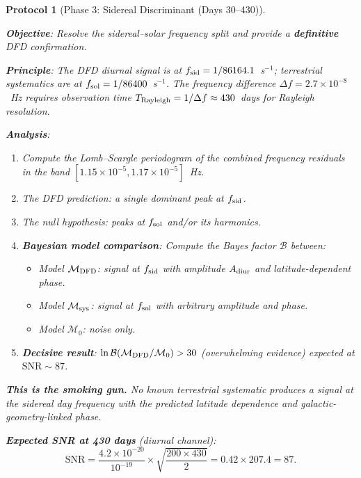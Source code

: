 \documentclass[11pt]{article}
\newtheorem{protocol}{Protocol}
\newcommand{\ee}[1]{\times 10^{#1}}
\begin{document}
\begin{protocol}[Phase 3: Sidereal Discriminant (Days 30--430)]
\label{prot:phase3}
\mbox{}

\textbf{Objective}: Resolve the sidereal--solar frequency split and
provide a \textbf{definitive} DFD confirmation.

\textbf{Principle}: The DFD diurnal signal is at $f_{\rm sid} =
1/86164.1$~s$^{-1}$; terrestrial systematics are at $f_{\rm sol} =
1/86400$~s$^{-1}$. The frequency difference $\Delta f = 2.7\ee{-8}$~Hz
requires observation time $T_{\rm Rayleigh} = 1/\Delta f \approx
430$~days for Rayleigh resolution.

\textbf{Analysis}:
\begin{enumerate}[nosep]
\item Compute the Lomb--Scargle periodogram of the combined frequency
  residuals in the band $[1.15\ee{-5}, 1.17\ee{-5}]$~Hz.
\item The DFD prediction: a single dominant peak at $f_{\rm sid}$.
\item The null hypothesis: peaks at $f_{\rm sol}$ and/or its harmonics.
\item \textbf{Bayesian model comparison}: Compute the Bayes factor
  $\mathcal{B}$ between:
  \begin{itemize}[nosep]
  \item Model $\mathcal{M}_{\rm DFD}$: signal at $f_{\rm sid}$ with
    amplitude $A_{\rm diur}$ and latitude-dependent phase.
  \item Model $\mathcal{M}_{\rm sys}$: signal at $f_{\rm sol}$ with
    arbitrary amplitude and phase.
  \item Model $\mathcal{M}_0$: noise only.
  \end{itemize}
\item \textbf{Decisive result}: $\ln\mathcal{B}(\mathcal{M}_{\rm DFD}/
  \mathcal{M}_0) > 30$ (overwhelming evidence) expected at
  $\text{SNR} \sim 87$.
\end{enumerate}

\textbf{This is the smoking gun.} No known terrestrial systematic
produces a signal at the sidereal day frequency with the predicted
latitude dependence and galactic-geometry-linked phase.

\textbf{Expected SNR at 430 days} (diurnal channel):
\begin{equation}
\text{SNR} = \frac{4.2\ee{-20}}{10^{-19}}\times
\sqrt{\frac{200\times 430}{2}} = 0.42\times 207.4 = 87.
\end{equation}
\end{protocol}
\end{document}
